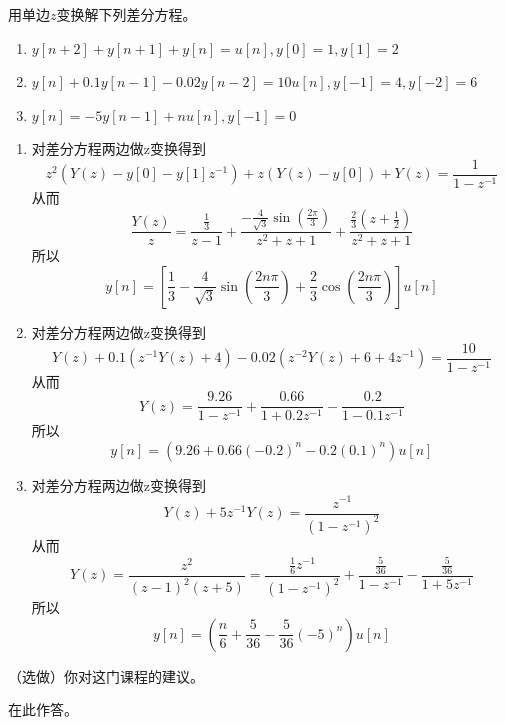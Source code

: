 \documentclass[answers]{exam}  %
\begin{document}
\begin{questions}
\question 用单边$z$变换解下列差分方程。
\begin{enumerate}[(1)]
\item $y[n+2]+y[n+1]+y[n]=u[n],y[0]=1,y[1]=2$
\item $y[n]+0.1y[n-1]-0.02y[n-2]=10u[n],y[-1]=4,y[-2]=6$
\item $y[n]=-5y[n-1]+nu[n],y[-1]=0$
\end{enumerate}
\begin{solution}
\begin{enumerate}[(1)]
	\item 对差分方程两边做z变换得到$$z^2(Y(z)-y[0]-y[1]z^{-1})+z(Y(z)-y[0])+Y(z)=\frac{1}{1-z^{-1}}$$从而$$\frac{Y(z)}{z}=\frac{\frac{1}{3}}{z-1}+\frac{-\frac{4}{\sqrt{3}}\sin(\frac{2\pi}{3})}{z^2+z+1}+\frac{\frac{2}{3}(z+\frac{1}{2})}{z^2+z+1}$$
	所以$$y[n]=[\frac{1}{3}-\frac{4}{\sqrt{3}}\sin(\frac{2n\pi}{3})+\frac{2}{3}\cos(\frac{2n\pi}{3})]u[n]$$
	\item 对差分方程两边做z变换得到$$Y(z)+0.1(z^{-1}Y(z)+4)-0.02(z^{-2}Y(z)+6+4z^{-1})=\frac{10}{1-z^{-1}}$$从而$$Y(z)=\frac{9.26}{1-z^{-1}}+\frac{0.66}{1+0.2z^{-1}}-\frac{0.2}{1-0.1z^{-1}}$$所以$$y[n]=(9.26+0.66(-0.2)^n-0.2(0.1)^n)u[n]$$
	\item 对差分方程两边做z变换得到$$Y(z)+5z^{-1}Y(z)=\frac{z^{-1}}{(1-z^{-1})^2}$$从而$$Y(z)=\frac{z^{2}}{(z-1)^2(z+5)}=\frac{\frac{1}{6}z^{-1}}{(1-z^{-1})^2}+\frac{\frac{5}{36}}{1-z^{-1}}-\frac{\frac{5}{36}}{1+5z^{-1}}$$所以$$y[n]=(\frac{n}{6}+\frac{5}{36}-\frac{5}{36}(-5)^n)u[n]$$
\end{enumerate}
\end{solution}

\question （选做）你对这门课程的建议。
\begin{solution}
	在此作答。
\end{solution}


\end{questions}
\end{document}
